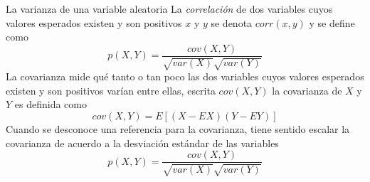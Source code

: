 La varianza de una variable aleatoria
La \emph{correlación} de dos variables cuyos valores esperados existen y son positivos $x$ y $y$ se denota $corr(x,y)$ y se define como
\begin{equation}
p(X,Y)=\frac{cov(X,Y)}{\sqrt{var(X)}\sqrt{var(Y)}}
\end{equation}
La covarianza mide qué tanto o tan poco las dos variables cuyos valores esperados existen y son positivos varían entre ellas, escrita $cov(X,Y)$ la covarianza de $X$ y $Y$ es definida como
\begin{equation}
cov(X,Y)=E[(X-EX)(Y-EY)]
\end{equation}
Cuando se desconoce una referencia para la covarianza, tiene sentido escalar la covarianza de acuerdo a la desviación estándar de las variables
\begin{equation}
p(X,Y)=\frac{cov(X,Y)}{\sqrt{var(X)}\sqrt{var(Y)}}
\end{equation}
